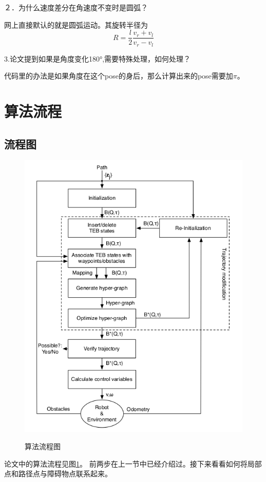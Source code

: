 \documentclass[10pt,a4paper]{article}
\theoremstyle{mythm}
\numberwithin{equation}{section}
\begin{document}
２．为什么速度差分在角速度不变时是圆弧？

网上直接默认的就是圆弧运动。其旋转半径为
$$
R = \frac{l}{2}\frac{v_r+v_l}{v_r-v_l}
$$ 

3.论文提到如果是角度变化180°,需要特殊处理，如何处理？

代码里的办法是如果角度在这个pose的身后，那么计算出来的pose需要加$\pi$。

\section{算法流程}
\subsection{流程图}
\begin{figure}[htbp]
\centering  %
\label{Fig.2}
\includegraphics[width=1\textwidth]{teb_flow}
\caption{算法流程图}
\end{figure}
论文中的算法流程见图\ref{Fig.2}。
前两步在上一节中已经介绍过。接下来看看如何将局部点和路径点与障碍物点联系起来。
\end{document}
